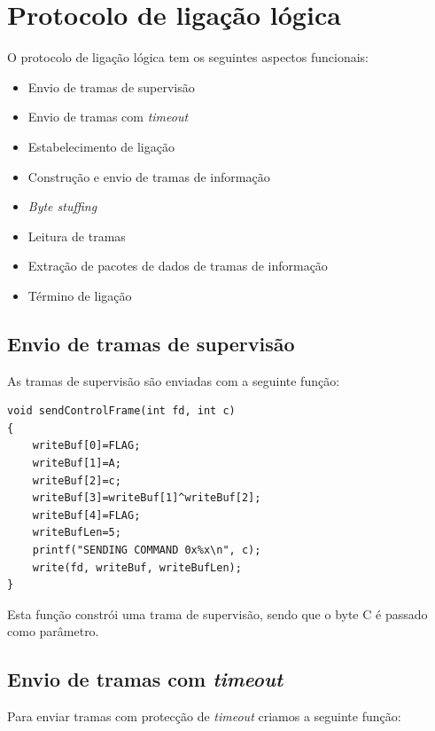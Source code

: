\documentclass[a4paper,11pt]{article}
\begin{document}

\newpage

\section{Protocolo de ligação lógica}
O protocolo de ligação lógica tem os seguintes aspectos funcionais:
\begin{itemize}
  \item Envio de tramas de supervisão
  \item Envio de tramas com \textit{timeout}
  \item Estabelecimento de ligação
  \item Construção e envio de tramas de informação
  \item \textit{Byte stuffing}
  \item Leitura de tramas
  \item Extração de pacotes de dados de tramas de informação
  \item Término de ligação
\end{itemize}

\subsection{Envio de tramas de supervisão}

As tramas de supervisão são enviadas com a seguinte função:\\

\lstset{language=C,
		showstringspaces=false}
		
\begin{lstlisting}
void sendControlFrame(int fd, int c)
{
    writeBuf[0]=FLAG;
    writeBuf[1]=A;
    writeBuf[2]=c;
    writeBuf[3]=writeBuf[1]^writeBuf[2];
    writeBuf[4]=FLAG;
    writeBufLen=5;
    printf("SENDING COMMAND 0x%x\n", c);
    write(fd, writeBuf, writeBufLen);  
}
\end{lstlisting}
Esta função constrói uma trama de supervisão, sendo que o byte C é passado como parâmetro.

\subsection{Envio de tramas com \textit{timeout}}

Para enviar tramas com protecção de \textit{timeout} criamos a seguinte função:
\end{document}
